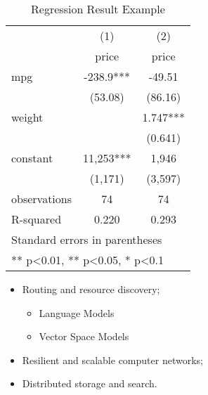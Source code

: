 \documentclass[geye,blue,normal,cn]{elegantnote}
\begin{document}
	

\begin{table}[!htbp]
  \small
  \centering
  \caption{Regression Result Example}
    \begin{tabular}{lll}
    \toprule
          & \multicolumn{1}{c}{(1)} & \multicolumn{1}{c}{(2)} \\
      & \multicolumn{1}{c}{price} & \multicolumn{1}{c}{price} \\
    \midrule
    mpg   & \multicolumn{1}{c}{-238.9***} & \multicolumn{1}{c}{-49.51} \\
          & \multicolumn{1}{c}{(53.08)} & \multicolumn{1}{c}{(86.16)} \\
    weight & \multicolumn{1}{c}{} & \multicolumn{1}{c}{1.747***} \\
          & \multicolumn{1}{c}{} & \multicolumn{1}{c}{(0.641)} \\
    constant & \multicolumn{1}{c}{11,253***} & \multicolumn{1}{c}{1,946} \\
          & \multicolumn{1}{c}{(1,171)} & \multicolumn{1}{c}{(3,597)} \\
    observations & \multicolumn{1}{c}{74} & \multicolumn{1}{c}{74} \\
    R-squared & \multicolumn{1}{c}{0.220} & \multicolumn{1}{c}{0.293} \\
    \midrule
    \multicolumn{3}{l}{\scriptsize Standard errors in parentheses} \\
    \multicolumn{3}{l}{\scriptsize *** p<0.01, ** p<0.05, * p<0.1} \\
    \end{tabular}%
  \label{tab:reg}%
\end{table}%


\begin{itemize}[noitemsep]
	\item Routing and resource discovery;
	     \begin{itemize} 
      	   	\item Language Models
       	 	\item Vector Space Models
    		 \end{itemize}
	\item Resilient and scalable computer networks;
	\item Distributed storage and search.
\end{itemize}
\end{document}

